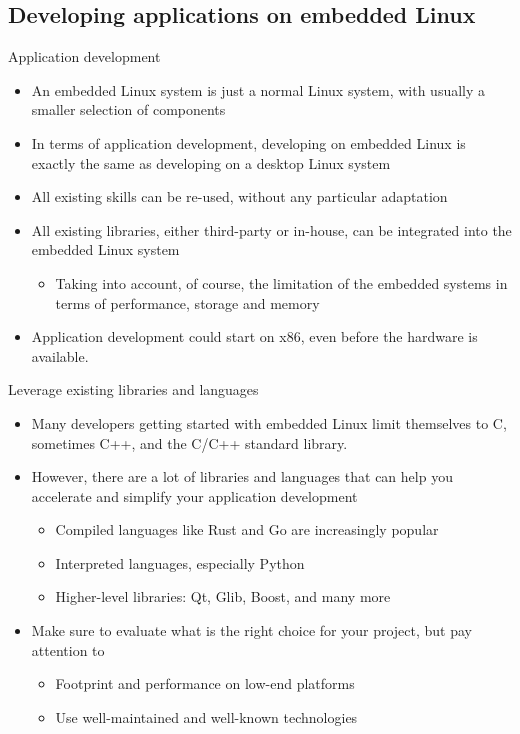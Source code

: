 \subsection{Developing applications on embedded Linux}

\begin{frame}{Application development}
  \begin{itemize}
  \item An embedded Linux system is just a normal Linux system, with
    usually a smaller selection of components
  \item In terms of application development, developing on embedded
    Linux is exactly the same as developing on a desktop Linux system
  \item All existing skills can be re-used, without any particular
    adaptation
  \item All existing libraries, either third-party or in-house, can be
    integrated into the embedded Linux system
    \begin{itemize}
    \item Taking into account, of course, the limitation of the
      embedded systems in terms of performance, storage and memory
    \end{itemize}
  \item Application development could start on x86, even before
      the hardware is available.
  \end{itemize}
\end{frame}

\begin{frame}{Leverage existing libraries and languages}
  \begin{itemize}
  \item Many developers getting started with embedded Linux limit
    themselves to C, sometimes C++, and the C/C++ standard library.
  \item However, there are a lot of libraries and languages that can
    help you accelerate and simplify your application development
    \begin{itemize}
    \item Compiled languages like Rust and Go are increasingly popular
    \item Interpreted languages, especially Python
    \item Higher-level libraries: Qt, Glib, Boost, and many more
    \end{itemize}
  \item Make sure to evaluate what is the right choice for your
    project, but pay attention to
    \begin{itemize}
    \item Footprint and performance on low-end platforms
    \item Use well-maintained and well-known technologies
    \end{itemize}
  \end{itemize}
\end{frame}

